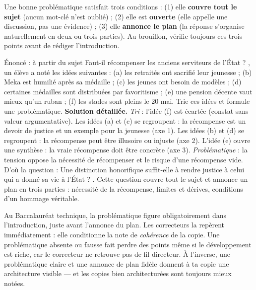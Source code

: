 \documentclass[11pt]{article}
\begin{document}
\begin{propriete}
Une bonne problématique satisfait trois conditions : (1) elle \textbf{couvre tout le sujet} (aucun mot-clé n'est oublié) ; (2) elle est \textbf{ouverte} (elle appelle une discussion, pas une évidence) ; (3) elle \textbf{annonce le plan} (la réponse s'organise naturellement en deux ou trois parties). Au brouillon, vérifie toujours ces trois points avant de rédiger l'introduction.
\end{propriete}

\begin{exoresolu}
Énoncé : à partir du sujet \og Faut-il récompenser les anciens serviteurs de l'État ? \fg, un élève a noté les idées suivantes : (a) les retraités ont sacrifié leur jeunesse ; (b) Meka est humilié après sa médaille ; (c) les jeunes ont besoin de modèles ; (d) certaines médailles sont distribuées par favoritisme ; (e) une pension décente vaut mieux qu'un ruban ; (f) les stades sont pleins le 20 mai. Trie ces idées et formule une problématique.
\tcblower
\textbf{Solution détaillée.} \emph{Tri} : l'idée (f) est écartée (constat sans valeur argumentative). Les idées (a) et (c) se regroupent : la récompense est un devoir de justice et un exemple pour la jeunesse (axe 1). Les idées (b) et (d) se regroupent : la récompense peut être illusoire ou injuste (axe 2). L'idée (e) ouvre une synthèse : la vraie récompense doit être concrète (axe 3). \emph{Problématique} : la tension oppose la nécessité de récompenser et le risque d'une récompense vide. D'où la question : \og Une distinction honorifique suffit-elle à rendre justice à celui qui a donné sa vie à l'État ? \fg. Cette question couvre tout le sujet et annonce un plan en trois parties : nécessité de la récompense, limites et dérives, conditions d'un hommage véritable.
\end{exoresolu}

\begin{savaistu}
Au Baccalauréat technique, la problématique figure obligatoirement dans l'introduction, juste avant l'annonce du plan. Les correcteurs la repèrent immédiatement : elle conditionne la note de \emph{cohérence} de la copie. Une problématique absente ou fausse fait perdre des points même si le développement est riche, car le correcteur ne retrouve pas de fil directeur. À l'inverse, une problématique claire et une annonce de plan fidèle donnent à ta copie une architecture visible — et les copies bien architecturées sont toujours mieux notées.
\end{savaistu}
\end{document}
